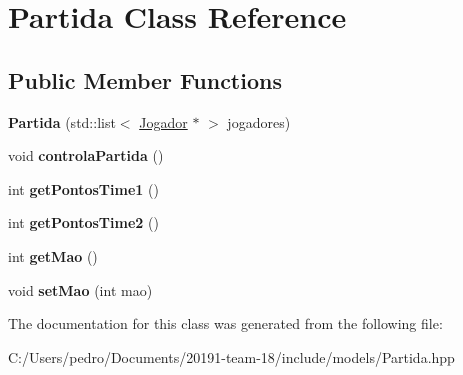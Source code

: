 \hypertarget{class_partida}{}\section{Partida Class Reference}
\label{class_partida}
\subsection*{Public Member Functions}
\begin{DoxyCompactItemize}
\item 
\mbox{\label{class_partida_a34df2e467d28b2d1008974d2a37487df}} 
{\bfseries Partida} (std\+::list$<$ \mbox{\hyperlink{class_jogador}{Jogador}} $\ast$ $>$ jogadores)
\item 
\mbox{\label{class_partida_ac33f17557cd766c7daccdc26dcaba906}} 
void {\bfseries controla\+Partida} ()
\item 
\mbox{\label{class_partida_a1d9b8b8eac2fe8f17b106bd490224e5f}} 
int {\bfseries get\+Pontos\+Time1} ()
\item 
\mbox{\label{class_partida_a4db751262e00977351b498ee1829da04}} 
int {\bfseries get\+Pontos\+Time2} ()
\item 
\mbox{\label{class_partida_adf7d1fed0f7b69d2ba340f828a9e8691}} 
int {\bfseries get\+Mao} ()
\item 
\mbox{\label{class_partida_a5fbccef64121a95053364f097a5a95ce}} 
void {\bfseries set\+Mao} (int mao)
\end{DoxyCompactItemize}


The documentation for this class was generated from the following file\+:\begin{DoxyCompactItemize}
\item 
C\+:/\+Users/pedro/\+Documents/20191-\/team-\/18/include/models/Partida.\+hpp\end{DoxyCompactItemize}
